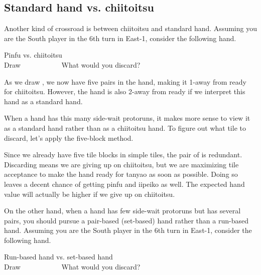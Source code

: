 \newpage
\subsection{Standard hand vs. {\jap chiitoitsu}}
Another kind of crossroad is between {\jap chiitoitsu} and standard hand. Assuming you are the South player in the 6th turn in East-1, consider the following hand.
\bigskip
\begin{itembox}[r]{{\jap Pinfu} vs. {\jap chiitoitsu}}
\bp
{}\bei\bei~\\
\hfill\footnotesize{Draw~~~~~~~~~~~}
\ep
\vspace{-17pt}What would you discard? \vspace{-5pt}
\end{itembox}

\bigskip
\noindent As we draw {\LARGE{}}, we now have five pairs in the hand, making it 1-away from ready for {\jap chiitoitsu}. However, the hand is also 2-away from ready if we interpret this hand as a standard hand.

\bigskip
When a hand has this many side-wait protoruns, it makes more sense to view it as a standard hand rather than as a {\jap chiitoitsu} hand. To figure out what tile to discard, let's apply the five-block method.

\emj
Since we already have five tile blocks in simple tiles, the pair of {\LARGE\bei} is redundant. Discarding {\LARGE\bei} means we are giving up on {\jap chiitoitsu}, but we are maximizing tile acceptance to make the hand ready for {\jap tanyao} as soon as possible. Doing so leaves a decent chance of getting {\jap pinfu} and {\jap iipeiko} as well. The expected hand value will actually be higher if we give up on {\jap chiitoitsu}.

\bigskip
On the other hand, when a hand has few side-wait protoruns but has several pairs, you should pursue a pair-based (set-based) hand rather than a run-based hand. Assuming you are the South player in the 6th turn in East-1, consider the following hand.

\bigskip
\begin{itembox}[r]{Run-based hand vs. set-based hand}
\bp
{}\dong\nan\bai~\bai\\
\hfill\footnotesize{Draw~~~~~~~~~~~}
\ep
\vspace{-17pt}What would you discard? \vspace{-5pt}
\end{itembox}

